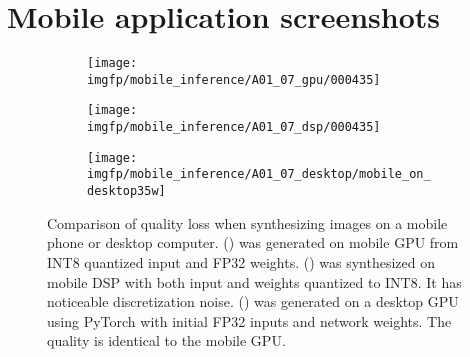 \clearpage
\newpage

\section{Mobile application screenshots}
\label{appb:mobile-screenshots}

\begin{figure}[h]
	\centering
	\begin{subfigure}[b]{0.32\textwidth}
		\centering
		\texttt{[image: \\imgfp/mobile\_inference/A01\_07\_gpu/000435]}%
		\caption{}
		\label{fig:infer_gpu}
	\end{subfigure}
	\hfill
	\begin{subfigure}[b]{0.32\textwidth}
		\centering
		\texttt{[image: \\imgfp/mobile\_inference/A01\_07\_dsp/000435]}
		\caption{}
		\label{fig:infer_dsp}
	\end{subfigure}
	\hfill
	\begin{subfigure}[b]{0.32\textwidth}
		\centering
		\texttt{[image: \\imgfp/mobile\_inference/A01\_07\_desktop/mobile\_on\_desktop35w]}
		\caption{}
		\label{fig:infer_desktop}
	\end{subfigure}
	\caption{Comparison of quality loss when synthesizing images on a mobile phone or desktop computer. (\protect{}) was generated on mobile GPU from INT8 quantized input and FP32 weights. (\protect{}) was synthesized on mobile DSP with both input and weights quantized to INT8. It has noticeable discretization noise. (\protect{}) was generated on a desktop GPU using PyTorch with initial FP32 inputs and network weights. The quality is identical to the mobile GPU.}
\end{figure}
